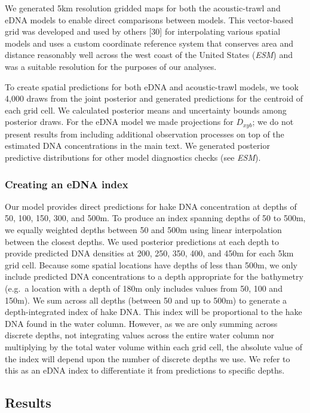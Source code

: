 \documentclass[
]{article}
\begin{document}
We generated 5km resolution gridded maps for both the acoustic-trawl and
eDNA models to enable direct comparisons between models. This
vector-based grid was developed and used by others {[}30{]} for
interpolating various spatial models and uses a custom coordinate
reference system that conserves area and distance reasonably well across
the west coast of the United States (\emph{ESM}) and was a suitable resolution for the purposes of our analyses.

To create spatial predictions for both eDNA and acoustic-trawl models,
we took 4,000 draws from the joint posterior and generated predictions
for the centroid of each grid cell. We calculated posterior means and
uncertainty bounds among posterior draws. For the eDNA model we made
projections for \(D_{xyb}\); we do not present results from including
additional observation processes on top of the estimated DNA
concentrations in the main text. We generated posterior predictive distributions for
other model diagnostics checks (see \textit{ESM}).

\hypertarget{creating-an-edna-index}{%
\subsubsection{Creating an eDNA index}\label{creating-an-edna-index}}

Our model provides direct predictions for hake DNA concentration at
depths of 50, 100, 150, 300, and 500m. To produce an index spanning
depths of 50 to 500m, we equally weighted depths between 50 and
500m using linear interpolation between the closest depths. We used posterior predictions
at each depth to provide predicted DNA densities at 200, 250, 350, 400,
and 450m for each 5km grid cell. Because some spatial locations have depths of
less than 500m, we only include predicted DNA concentrations to a depth
appropriate for the bathymetry (e.g.~a location with a depth of 180m
only includes values from 50, 100 and 150m). We sum across all depths
(between 50 and up to 500m) to generate a depth-integrated index of hake
DNA. This index will be proportional to the hake DNA found in the water
column. However, as we are only summing across discrete depths, not
integrating values across the entire water column nor multiplying by the
total water volume within each grid cell, the absolute value of the
index will depend upon the number of discrete depths we use. We
refer to this as an eDNA index to differentiate it from predictions to specific depths.

\hypertarget{results}{%
\subsection{Results}\label{results}}
\end{document}
